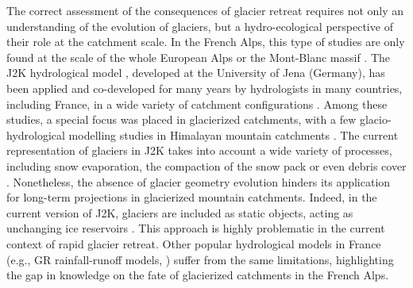 The correct assessment of the consequences of glacier retreat requires not only an understanding of the evolution of glaciers, but a hydro-ecological perspective of their role at the catchment scale. In the French Alps, this type of studies are only found at the scale of the whole European Alps \citep{coppola_impact_2018} or the Mont-Blanc massif \citep{laurent_impact_2020}. The J2K hydrological model \citep{krause_quantifying_2002}, developed at the University of Jena (Germany), has been applied and co-developed for many years by hydrologists in many countries, including France, in a wide variety of catchment configurations \citep{branger_investigating_2012, braud_j2000-rhone_2017, horner_information_2020}. Among these studies, a special focus was placed in glacierized catchments, with a few glacio-hydrological modelling studies in Himalayan mountain catchments \citep{gao_test_2012, nepal_understanding_2014}. The current representation of glaciers in J2K takes into account a wide variety of processes, including snow evaporation, the compaction of the snow pack or even debris cover \citep{nepal_understanding_2014}. Nonetheless, the absence of glacier geometry evolution hinders its application for long-term projections in glacierized mountain catchments. Indeed, in the current version of J2K, glaciers are included as static objects, acting as unchanging ice reservoirs \citep{nepal_understanding_2014}. This approach is highly problematic in the current context of rapid glacier retreat.  Other popular hydrological models in France (e.g., GR rainfall-runoff models, \cite{coron_suite_2017}) suffer from the same limitations, highlighting the gap in knowledge on the fate of glacierized catchments in the French Alps. 

